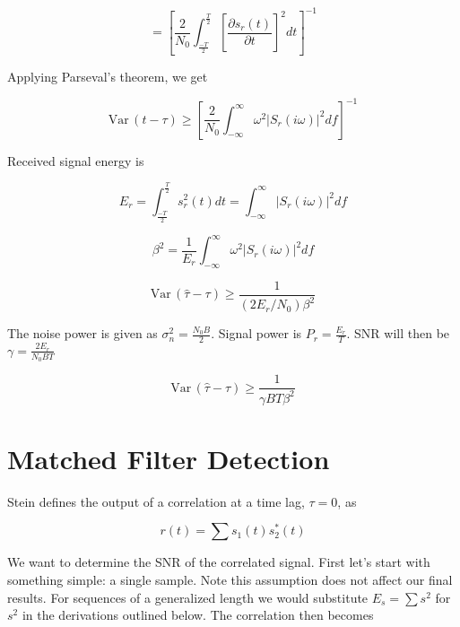 \documentclass[11pt]{article}
\def\Var{{\textrm{Var}}\,}
\begin{document}
\begin{equation}
= \left[ \frac{2}{N_0} \int^\frac{T}{2}_\frac{-T}{2} \left[ \frac{\partial s_r(t)}{\partial t} \right]^2 dt \right]^{-1}
\end{equation}

Applying Parseval's theorem, we get

\begin{equation}
\Var(t-\tau)
\geq
\left[ \frac{2}{N_0} \int^{\infty}_{-\infty} \omega^2 |S_r(i\omega )|^2 df \right]^{-1}
\end{equation}

Received signal energy is

\begin{equation}
E_r = \int^\frac{T}{2}_\frac{-T}{2} s_r^2(t)dt = \int^\infty_{-\infty} |S_r(i\omega)|^2 df
\end{equation}

\begin{equation}
\beta^2 = \frac{1}{E_r} \int^\infty_{-\infty} \omega^2 |S_r(i\omega)|^2 df
\end{equation}

\begin{equation}
\Var(\hat{\tau} - \tau)
\geq
\frac{1}{(2E_r/N_0)\beta^2}
\end{equation}

The noise power is given as $\sigma_n^2 = \frac{N_0B}{2}$. Signal power is $P_r = \frac{E_r}{T}$. SNR will then be $\gamma = \frac{2E_r}{N_0BT}$

\begin{equation}
\boxed{
\Var(\hat{\tau} - \tau)
\geq
\frac{1}{\gamma BT\beta^2}
}
\end{equation}


\section{Matched Filter Detection}

Stein defines the output of a correlation at a time lag, $\tau=0$, as

\begin{equation}
r(t) = \sum s_1(t)s^{*}_2(t)
\end{equation}


We want to determine the SNR of the correlated signal. First let's start with something simple: a single sample. Note this assumption does not affect our final results. For sequences of a generalized length we would substitute $E_s = \sum s^2$ for $s^2$ in the derivations outlined below. The correlation then becomes
\end{document}
